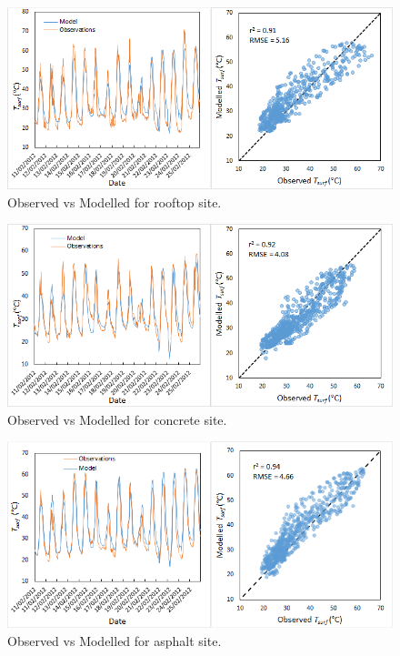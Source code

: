 \documentclass[final,3p,times,authoryear]{elsarticle}
\begin{document}
\begin{figure}[!htbp]
\includegraphics[trim=0mm 0mm 0mm 0mm, clip,scale=0.5]{images/roofobs.png}
 \caption{Observed vs Modelled  for rooftop site.} \label{fig:roofobs}
\end{figure}


\begin{figure}[!htbp]
\includegraphics[trim=0mm 0mm 0mm 0mm, clip,scale=0.5]{images/concreteobs.png}
 \caption{Observed vs Modelled  for concrete site.} \label{fig:concreteobs}
\end{figure}

\begin{figure}[!htbp]
\includegraphics[trim=0mm 0mm 0mm 0mm, clip,scale=0.5]{images/asphaltobs.png}
 \caption{Observed vs Modelled  for asphalt site.} \label{fig:asphaltobs}
\end{figure}
	
\end{document}
